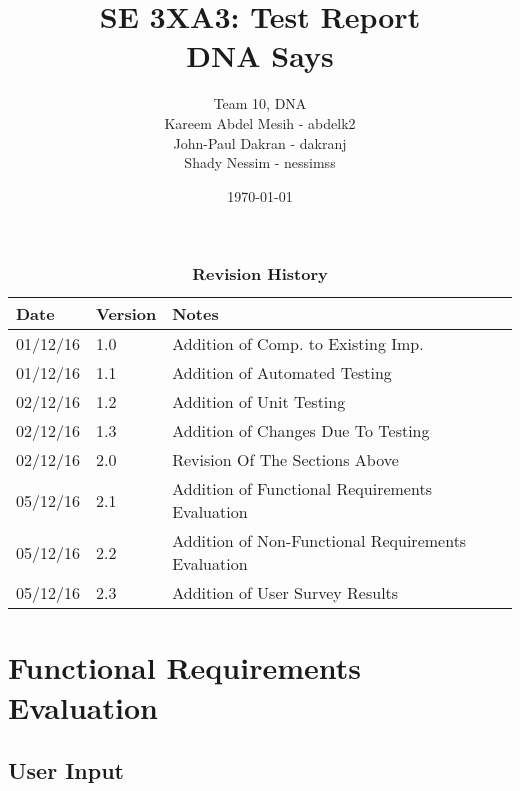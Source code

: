 \documentclass[12pt, titlepage]{article}
\title{SE 3XA3: Test Report\\DNA Says}
\author{Team 10, DNA
		\\ Kareem Abdel Mesih - abdelk2
		\\ John-Paul Dakran - dakranj
		\\ Shady Nessim - nessimss
}
\date{\today}
\begin{document}
\maketitle

\tableofcontents
\listoftables
\listoffigures

\begin{table}[h]
\caption{\bf Revision History}
\begin{tabularx}{\textwidth}{p{3cm}p{2cm}X}
\toprule {\bf Date} & {\bf Version} & {\bf Notes}\\
\midrule
01/12/16 & 1.0 & Addition of Comp. to Existing Imp.\\
01/12/16 & 1.1 & Addition of Automated Testing\\
02/12/16 & 1.2 & Addition of  Unit Testing\\
02/12/16 & 1.3 & Addition of Changes Due To Testing\\
02/12/16 & 2.0 & Revision Of The Sections Above\\
05/12/16 & 2.1 & Addition of Functional Requirements Evaluation\\
05/12/16 & 2.2 & Addition of Non-Functional Requirements Evaluation\\
05/12/16 & 2.3 & Addition of User Survey Results\\
\bottomrule
\end{tabularx}
\end{table}

\newpage


\section{Functional Requirements Evaluation}

\subsection{User Input}
\end{document}
